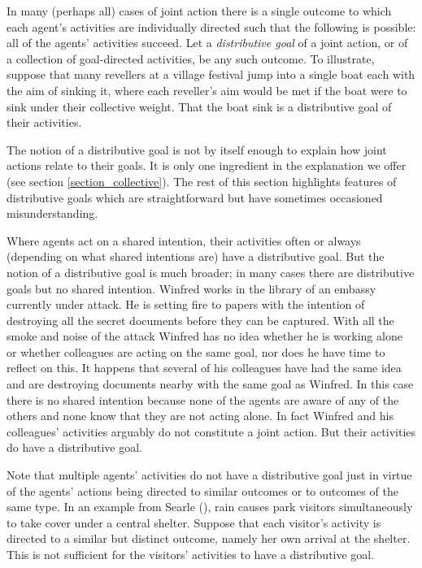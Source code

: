 \documentclass[12pt,a4paper]{extarticle}
\begin{document}
In many (perhaps all) cases of joint action there is a single outcome to which each agent's activities are individually directed such that the following is possible: all of the agents' activities succeed.  
Let a \emph{distributive goal} of a joint action, or of a collection of goal-directed activities, be any such outcome.  
To illustrate, suppose that many revellers at a village festival jump into a single boat each with the aim of sinking it, where each reveller's aim would be met if the boat were to sink under their collective weight.  
That the boat sink is a distributive goal of their activities.

The notion of a distributive goal is not by itself enough to explain how joint actions relate to their goals.  
It is only one ingredient in the explanation we offer (see section \vref{section_collective}).  
The rest of this section highlights features of distributive goals which are  straightforward  but have sometimes occasioned misunderstanding.

Where agents act on a shared intention, their activities often or always (depending on what shared intentions are) have a distributive goal.  
But the notion of a distributive goal is much broader; in many cases there are distributive goals but no shared intention.
Winfred works in the library of an embassy currently under attack.  
He is setting fire to papers with the intention of destroying all the secret documents before they can be captured.
With all the smoke and  noise of the attack Winfred has no idea whether he is working alone or whether colleagues are acting on the same goal, nor does he have time to reflect on this.
It happens that several of his colleagues have had the same idea and are destroying documents nearby with the same goal as Winfred.
In this case there is no shared intention because none of the agents are aware of any of the others and none know that they are not acting alone.
In fact Winfred and his colleagues' activities arguably do not constitute a joint action.
But their activities do have a distributive goal.


Note that multiple agents' activities do not have a distributive goal just in virtue of the agents' actions being directed to similar outcomes or to outcomes of the same type.  In an example from Searle (\citeyear[p.\ 92]{Searle:1990em}), rain causes park visitors simultaneously to take cover under a central shelter.  Suppose that each visitor's activity is directed to a similar but distinct outcome, namely her own arrival at the shelter.  This is not sufficient for the visitors' activities to have a distributive goal.
\end{document}
